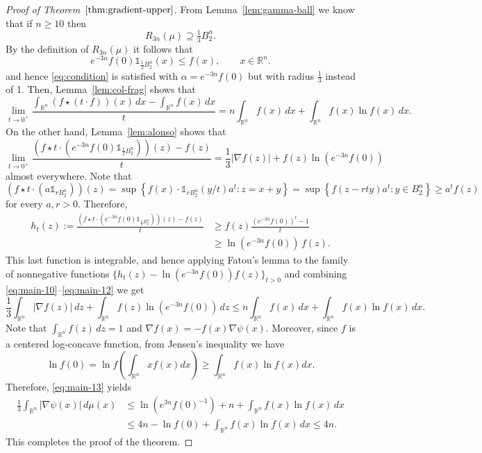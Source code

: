 \documentclass[11pt,leqno]{article}
\theoremstyle{definition}
\theoremstyle{remark}
\numberwithin{equation}{section}
\newcommand{\ls}{\leqslant}
\newcommand{\gr}{\geqslant}
\newcommand{\1}{\textbf{1}}
\begin{document}
\begin{proof}[Proof of Theorem~$\ref{thm:gradient-upper}$] From Lemma~\ref{lem:gamma-ball} we know that if $n\gr 10$ then
$$R_{3n}(\mu)\supseteq  \tfrac{1}{3}B_2^n.$$
By the definition of $R_{3n}(\mu)$ it follows that
\begin{equation}\label{eq:main-10}e^{-3n}f(0)\mathds{1}_{\tfrac{1}{3}B_2^n}(x)\ls f(x), \qquad x\in\mathbb{R}^n.\end{equation}
and hence \eqref{eq:condition} is satisfied with $\alpha =e^{-3n}f(0)$ but with radius $\tfrac13$ instead of 1. Then, Lemma~\ref{lem:col-frag} shows that
\begin{equation}\label{eq:main-11}\lim_{t\to 0^+}\frac{\int_{\mathbb{R}^n}(f\star (t\cdot f))(x)\,dx-\int_{\mathbb{R}^n}f(x)\,dx}{t}=n\int_{\mathbb{R}^n}f(x)\,dx
+\int_{\mathbb{R}^n}f(x)\ln f(x)\,dx.\end{equation}
On the other hand, Lemma~\ref{lem:alonso} shows that 
\begin{equation}\label{eq:main-12}\lim_{t\to 0^+}\frac{(f\star t\cdot (e^{-3n}f(0)\mathds{1}_{\tfrac{1}{3}B_2^n}))(z)-f(z)}{t}=
\frac{1}{3}|\nabla f(z)|+f(z)\ln (e^{-3n}f(0))\end{equation}
almost everywhere. Note that
$$(f\star t\cdot (a\mathds{1}_{rB_2^n}))(z)=\sup\left\{f(x)\cdot \mathds{1}_{rB_2^n}(y/t)a^t:z=x+y\right\}=\sup\left\{f(z-rty)a^t:y\in B_2^n\right\}\gr a^tf(z)$$
for every $a,r>0$. Therefore,
\begin{align*}h_t(z):=\frac{(f\star t\cdot (e^{-3n}f(0)\mathds{1}_{\tfrac{1}{3}B_2^n}))(z)-f(z)}{t}&\gr f(z) \frac{(e^{-3n}f(0))^t-1}{t}\\
&\gr\ln (e^{-3n}f(0))\,f(z).
\end{align*}
This last function is integrable, and hence applying Fatou's lemma to the family of nonnegative functions $\{h_t(z) - \ln(e^{-3n}f(0)) f(z)\}_{t>0}$ and combining \eqref{eq:main-10}--\eqref{eq:main-12} we get
\begin{equation}\label{eq:main-13}
\frac{1}{3}\int_{\mathbb{R}^n}|\nabla f(z)|\,dz+\int_{\mathbb{R}^n}f(z)\ln (e^{-3n}f(0))\,dz\ls n\int_{\mathbb{R}^n}f(x)\,dx+
\int_{\mathbb{R}^n}f(x)\ln f(x)\,dx.\end{equation}
Note that $\int_{\mathbb{R}^n}f(z)\,dz=1$ and $\nabla f(x)=-f(x)\nabla\psi(x)$. Moreover, since $f$ is a centered log-concave function, from Jensen's inequality
we have
\begin{equation}\label{eq:fradelizi-e^n-1}\ln f(0)=\ln f\left(\int_{\mathbb{R}^n} xf(x)dx\right)\gr\int_{\mathbb{R}^n}
f(x)\ln f(x)dx.\end{equation}
Therefore, \eqref{eq:main-13} yields
\begin{align}\label{eq:main-14}\frac{1}{3} \int_{\mathbb{R}^n}|\nabla\psi(x)|\,d\mu(x) &\ls \ln(e^{3n}f(0)^{-1})+n+\int_{\mathbb{R}^n}f(x)\ln f(x)\,dx\\
\nonumber &\ls 4n-\ln f(0)+\int_{\mathbb{R}^n}f(x)\ln f(x)\,dx\ls 4n.\end{align}
This completes the proof of the theorem.
\end{proof}
\end{document}
